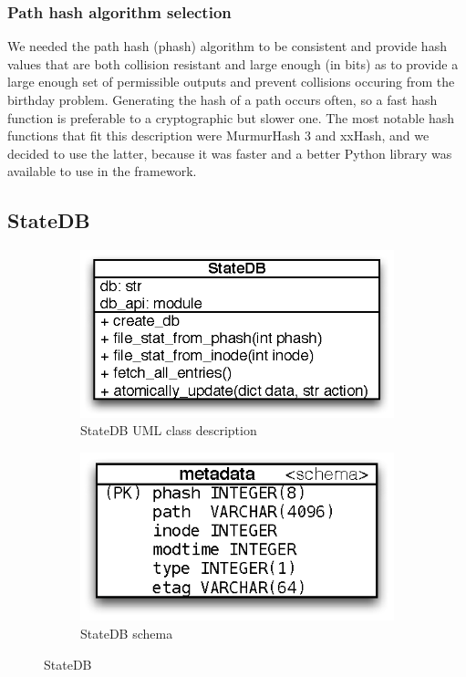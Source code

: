     \subsubsection{Path hash algorithm selection}
      We needed the path hash (phash) algorithm to be consistent and provide hash values that are both collision resistant and large enough (in bits) as to provide a large enough set of permissible outputs and prevent collisions occuring from the birthday problem. Generating the hash of a path occurs often, so a fast hash function is preferable to a cryptographic but slower one. The most notable hash functions that fit this description were MurmurHash 3 and xxHash\cite{xxhash}, and we decided to use the latter, because it was faster and a better Python library was available to use in the framework.

  \subsection{StateDB}
    \begin{figure}[!htpb]
      \centering
      \begin{subfigure}{0.45\textwidth}
        \includegraphics[width=\textwidth]{Images/StateDB.eps}
        \caption{StateDB UML class description}
        \label{fig:statedb_uml}
      \end{subfigure}
      \begin{subfigure}{0.45\textwidth}
        \includegraphics[width=\textwidth]{Images/StateDB_schema.eps}
        \caption{StateDB schema}
        \label{fig:statedb_schema}
      \end{subfigure}
      \caption{StateDB}
      \label{fig:statedb}
    \end{figure}
